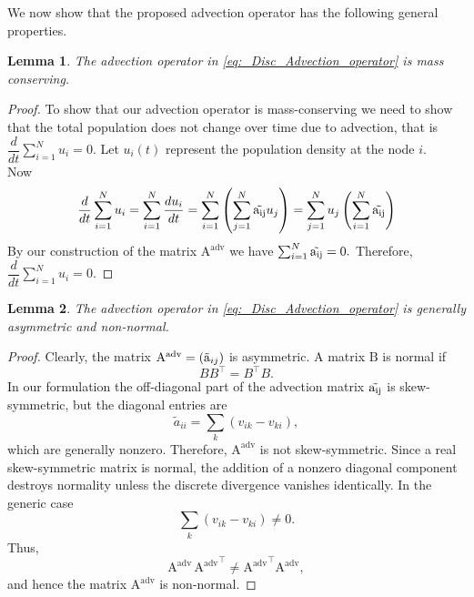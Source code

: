\documentclass[12pt]{article}
\newtheorem{lemma}{Lemma}[section] %
\begin{document}
\noindent We now show that the proposed advection operator has the following general properties.  

\begin{lemma}
    The advection operator in \eqref{eq:_Disc_Advection_operator} is mass conserving. 
\end{lemma}
\begin{proof}
    To show that our advection operator is mass-conserving we need to show that the total population does not change over time due to advection, that is $\dfrac{d}{dt}\sum_{i=1}^N u_i = 0.$ Let $u_i(t)$ represent the population density at the node $i$.\\
    Now \begin{equation}
        \begin{aligned}
            \dfrac{d}{dt}\sum_{i=1}^N u_i = \sum_{i=1}^N\dfrac{du_i}{dt} = \sum_{i=1}^N\left(\sum_{j=1}^N \mathrm{\Tilde{a_{ij}}}u_j\right)= \sum_{j=1}^N u_j \left( \sum_{i=1}^N \mathrm{\Tilde{a_{ij}}} \right)
        \end{aligned}
    \end{equation}
    By our construction of the matrix $\mathrm{A^{adv}}$ we have $\sum_{i=1}^N \mathrm{\Tilde{a_{ij}}}=0.$ Therefore, $\dfrac{d}{dt}\sum_{i=1}^N u_i = 0.$
\end{proof}
\begin{lemma}
The advection operator in \eqref{eq:_Disc_Advection_operator} is
generally asymmetric and non-normal.
\end{lemma}

\begin{proof}
Clearly, the matrix $\mathrm{A^{adv}}=(\mathrm{\Tilde{a}}_{ij})$ is asymmetric. A matrix $\mathrm{B}$ is normal if
\[
B B^{\top}
=
B^{\top}B.
\]
In our formulation the off-diagonal part of the advection matrix $\mathrm{\Tilde{a_{ij}}}$ is skew-symmetric,
but the diagonal entries are
\[
\widetilde a_{ii}
=
\sum_{k}(v_{ik}-v_{ki}),
\]
which are generally nonzero. Therefore, $\mathrm{A^{adv}} $ is not skew-symmetric. Since a real skew-symmetric matrix is normal,
the addition of a nonzero diagonal component destroys normality
unless the discrete divergence vanishes identically.
In the generic case 
\[
\sum_{k}(v_{ik}-v_{ki}) \neq 0.
\]
Thus, 
\[
\mathrm{A^{adv}}\, \mathrm{A^{adv}}^{\top}
\neq
\mathrm{A^{adv}}^{\top}\mathrm{A^{adv}},
\]
and hence the matrix $\mathrm{A^{adv}}$ is non-normal.
\end{proof}


\end{document}
